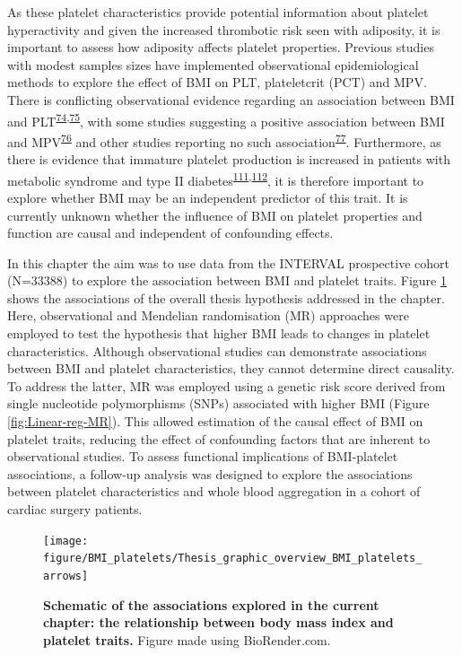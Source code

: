 \documentclass[11pt,twoside]{bristolthesis}
\begin{document}
As these platelet characteristics provide potential information about platelet hyperactivity and given the increased thrombotic risk seen with adiposity, it is important to assess how adiposity affects platelet properties. Previous studies with modest samples sizes have implemented observational epidemiological methods to explore the effect of BMI on PLT, plateletcrit (PCT) and MPV. There is conflicting observational evidence regarding an association between BMI and PLT\textsuperscript{\protect\hyperlink{ref-Furuncuoglu2016}{74},\protect\hyperlink{ref-Han2018a}{75}}, with some studies suggesting a positive association between BMI and MPV\textsuperscript{\protect\hyperlink{ref-Coban2005}{76}} and other studies reporting no such association\textsuperscript{\protect\hyperlink{ref-Heffron2018}{77}}. Furthermore, as there is evidence that immature platelet production is increased in patients with metabolic syndrome and type II diabetes\textsuperscript{\protect\hyperlink{ref-Vaduganathan2008a}{111},\protect\hyperlink{ref-Mijovic2015a}{112}}, it is therefore important to explore whether BMI may be an independent predictor of this trait. It is currently unknown whether the influence of BMI on platelet properties and function are causal and independent of confounding effects.

In this chapter the aim was to use data from the INTERVAL prospective cohort (N=33388) to explore the association between BMI and platelet traits. Figure \ref{fig:BMI-platelet-overview} shows the associations of the overall thesis hypothesis addressed in the chapter. Here, observational and Mendelian randomisation (MR) approaches were employed to test the hypothesis that higher BMI leads to changes in platelet characteristics. Although observational studies can demonstrate associations between BMI and platelet characteristics, they cannot determine direct causality. To address the latter, MR was employed using a genetic risk score derived from single nucleotide polymorphisms (SNPs) associated with higher BMI (Figure \ref{fig:Linear-reg-MR}). This allowed estimation of the causal effect of BMI on platelet traits, reducing the effect of confounding factors that are inherent to observational studies. To assess functional implications of BMI-platelet associations, a follow-up analysis was designed to explore the associations between platelet characteristics and whole blood aggregation in a cohort of cardiac surgery patients.



\begin{figure}

{\centering \texttt{[image: figure/BMI\_platelets/Thesis\_graphic\_overview\_BMI\_platelets\_arrows]} 

}

\caption[Schematic of the associations explored in the current chapter: the relationship between body mass index and platelet traits.]{\textbf{Schematic of the associations explored in the current chapter: the relationship between body mass index and platelet traits.} Figure made using BioRender.com.}\label{fig:BMI-platelet-overview}
\end{figure}
\end{document}
